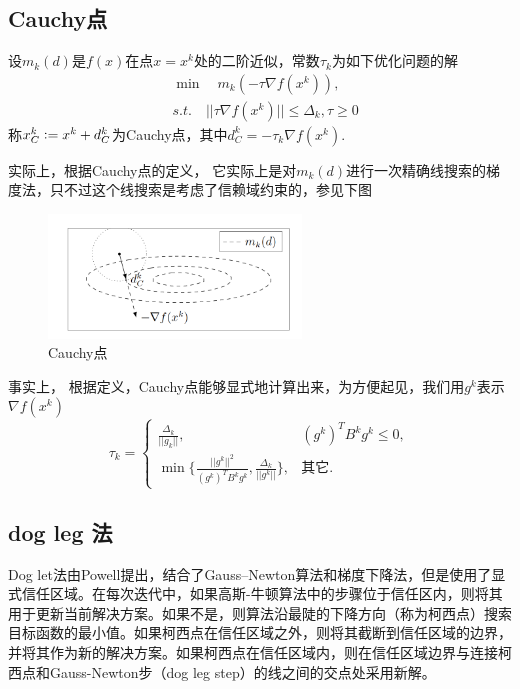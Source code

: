 \subsection{Cauchy点}
\begin{definition}[Cauchy点]
	设$m_k(d)$是$f(x)$在点$x=x^k$处的二阶近似，常数$\tau_k$为如下优化问题的解
	\begin{equation*}
		\begin{split}
			&\min\quad m_k(-\tau \nabla f(x^k)),\\
			&s.t.\quad ||\tau \nabla f(x^k)||\leq \Delta_k, \tau\geq 0
		\end{split}
	\end{equation*}
	称$x_C^k\vcentcolon = x^k + d_C^k$为Cauchy点，其中$d_C^k = -\tau_k\nabla f(x^k)$.
\end{definition}
实际上，根据Cauchy点的定义， 它实际上是对$m_k(d)$进行一次精确线搜索的梯度法，只不过这个线搜索是考虑了信赖域约束的，参见下图
\begin{figure}[h!]
\caption{Cauchy点}
\centering
\includegraphics[width=0.6\textwidth]{img/cauchypoint.png}
\end{figure}
事实上， 根据定义，Cauchy点能够显式地计算出来，为方便起见，我们用$g^k$表示$\nabla f(x^k)$
\begin{equation*}
	\tau_k = \begin{cases}
		\frac{\Delta_k}{||g_k||}, & (g^k)^TB^kg^k\leq 0,\\
		\min\{\frac{||g^k||^2}{(g^k)^TB^kg^k},\frac{\Delta_k}{||g^k||}\}, &\text{其它}.
	\end{cases}
\end{equation*}
\subsection{dog leg 法}
Dog let法由Powell提出，结合了Gauss–Newton算法和梯度下降法，但是使用了显式信任区域。在每次迭代中，如果高斯-牛顿算法中的步骤位于信任区内，则将其用于更新当前解决方案。如果不是，则算法沿最陡的下降方向（称为柯西点）搜索目标函数的最小值。如果柯西点在信任区域之外，则将其截断到信任区域的边界，并将其作为新的解决方案。如果柯西点在信任区域内，则在信任区域边界与连接柯西点和Gauss-Newton步（dog leg step）的线之间的交点处采用新解。
